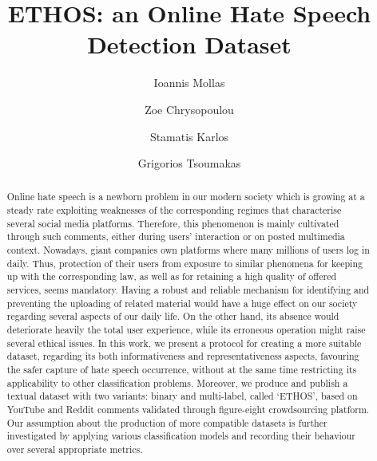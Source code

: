 \documentclass[sigconf]{acmart}
\begin{document}
\title{ETHOS: an Online Hate Speech Detection Dataset}\author{Ioannis Mollas}

\author{Zoe Chrysopoulou}

\author{Stamatis Karlos}

\author{Grigorios Tsoumakas}
\renewcommand{\shortauthors}{Mollas, Chrysopoulou, Karlos and Tsoumakas}


\begin{abstract}
Online hate speech is a newborn problem in our modern society which is growing at a steady rate exploiting weaknesses of the corresponding regimes that characterise several social media platforms. Therefore, this phenomenon is mainly cultivated through such comments, either during users' interaction or on posted multimedia context. Nowadays, giant companies own platforms where many millions of users log in daily. Thus, protection of their users from exposure to similar phenomena for keeping up with the corresponding law, as well as for retaining a high quality of offered services, seems mandatory. Having a robust and reliable mechanism for identifying and preventing the uploading of related material would have a huge effect on our society regarding several aspects of our daily life. On the other hand, its absence would deteriorate heavily the total user experience, while its erroneous operation might raise several ethical issues. In this work, we present a protocol for creating a more suitable dataset, regarding its both informativeness and representativeness aspects, favouring the safer capture of hate speech occurrence, without at the same time restricting its applicability to other classification problems. Moreover, we produce and publish a textual dataset with two variants: binary and multi-label, called `ETHOS', based on YouTube and Reddit comments validated through figure-eight crowdsourcing platform. Our assumption about the production of more compatible datasets is further investigated by applying various classification models and recording their behaviour over several appropriate metrics.
\end{abstract}
\end{document}
